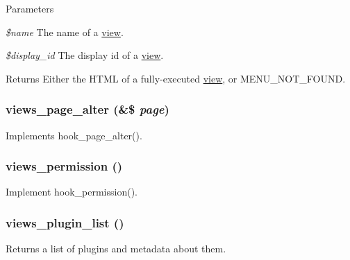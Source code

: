 \begin{DoxyParams}{Parameters}
\item[{\em \$name}]The name of a \hyperlink{classview}{view}. \item[{\em \$display\_\-id}]The display id of a \hyperlink{classview}{view}.\end{DoxyParams}
\begin{DoxyReturn}{Returns}
Either the HTML of a fully-\/executed \hyperlink{classview}{view}, or MENU\_\-NOT\_\-FOUND. 
\end{DoxyReturn}
\hypertarget{views_8module_a278afcd00ca124837da7016ede4e64b2}{
\subsubsection[{views\_\-page\_\-alter}]{\setlength{\rightskip}{0pt plus 5cm}views\_\-page\_\-alter (\&\$ {\em page})}}
\label{views_8module_a278afcd00ca124837da7016ede4e64b2}
Implements hook\_\-page\_\-alter(). \hypertarget{views_8module_a0d62d027dd49788bfa55b9011c0af70f}{
\subsubsection[{views\_\-permission}]{\setlength{\rightskip}{0pt plus 5cm}views\_\-permission ()}}
\label{views_8module_a0d62d027dd49788bfa55b9011c0af70f}
Implement hook\_\-permission(). \hypertarget{views_8module_a29c38bcb5187337aaa3fa82750bb67b9}{
\subsubsection[{views\_\-plugin\_\-list}]{\setlength{\rightskip}{0pt plus 5cm}views\_\-plugin\_\-list ()}}
\label{views_8module_a29c38bcb5187337aaa3fa82750bb67b9}
Returns a list of plugins and metadata about them.

